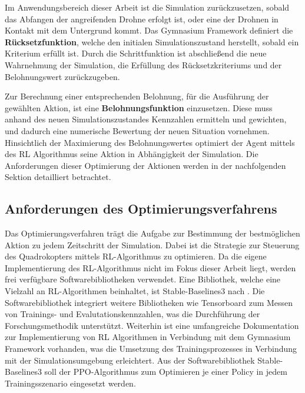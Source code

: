 Im Anwendungsbereich dieser Arbeit ist die Simulation zurückzusetzen, sobald das Abfangen der angreifenden Drohne erfolgt ist, oder eine der Drohnen in Kontakt mit dem Untergrund kommt.
Das Gymnasium Framework definiert die \textbf{Rücksetzfunktion}, welche den initialen Simulationszustand herstellt, sobald ein Kriterium erfüllt ist.
Durch die Schrittfunktion ist abschließend die neue Wahrnehmung der Simulation, die Erfüllung des Rücksetzkriteriums und der Belohnungswert zurückzugeben.

Zur Berechnung einer entsprechenden Belohnung, für die Ausführung der gewählten Aktion, ist eine \textbf{Belohnungsfunktion} einzusetzen.
Diese muss anhand des neuen Simulationszustandes Kennzahlen ermitteln und gewichten, und dadurch eine numerische Bewertung der neuen Situation vornehmen.
Hinsichtlich der Maximierung des Belohnungswertes optimiert der Agent mittels des RL Algorithmus seine Aktion in Abhängigkeit der Simulation. %
Die Anforderungen dieser Optimierung der Aktionen werden in der nachfolgenden Sektion detailliert betrachtet.

\subsection{Anforderungen des Optimierungsverfahrens}

Das Optimierungsverfahren trägt die Aufgabe zur Bestimmung der bestmöglichen Aktion zu jedem Zeitschritt der Simulation.
Dabei ist die Strategie zur Steuerung des Quadrokopters mittels RL-Algorithmus zu optimieren. %
Da die eigene Implementierung des RL-Algorithmus nicht im Fokus dieser Arbeit liegt, werden frei verfügbare Softwarebibliotheken verwendet.
Eine Bibliothek, welche eine Vielzahl an RL-Algorithmen beinhaltet, ist Stable-Baselines3 nach \cite[]{Raffin.2021}.
Die Softwarebibliothek integriert weitere Bibliotheken wie Tensorboard zum Messen von Trainings- und Evalutationskennzahlen, was die Durchführung der Forschungsmethodik unterstützt.
Weiterhin ist eine umfangreiche Dokumentation zur Implementierung von RL Algorithmen in Verbindung mit dem Gymnasium Framework vorhanden, was die Umsetzung des Trainingsprozesses in Verbindung mit der Simulationsumgebung erleichtert. %
Aus der Softwarebibliothek Stable-Baselines3 soll der PPO-Algorithmus zum Optimieren je einer Policy in jedem Trainingsszenario eingesetzt werden. 

